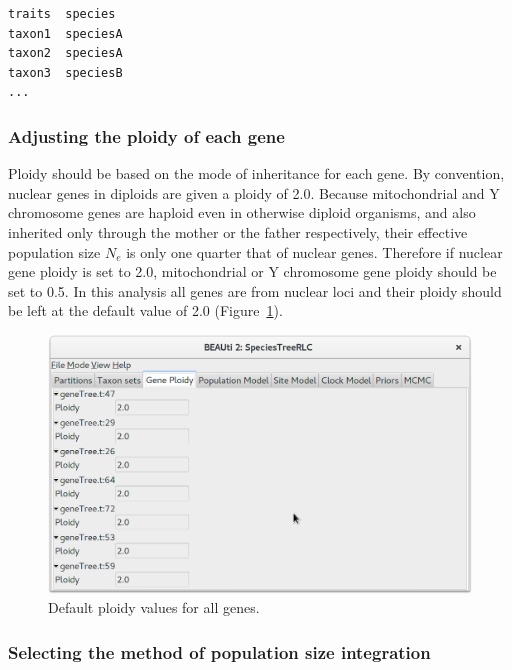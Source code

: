 \documentclass{article}
\begin{document}
\begin{minipage}[h]{0.7\textwidth}
\begin{verbatim}
traits	species
taxon1	speciesA
taxon2	speciesA
taxon3	speciesB
...
\end{verbatim}
\end{minipage}

\vspace{12pt}

\subsubsection*{Adjusting the ploidy of each gene}

Ploidy should be based on the mode of inheritance for each gene. By convention,
nuclear genes in diploids are given a ploidy of 2.0. Because mitochondrial and Y
chromosome genes are haploid even in otherwise diploid organisms, and also
inherited only through the mother or the father respectively, their effective
population size $N_e$ is only one quarter that of nuclear genes. Therefore if
nuclear gene ploidy is set to 2.0, mitochondrial or Y chromosome gene ploidy
should be set to 0.5. In this analysis all genes are from nuclear loci and their
ploidy should be left at the default value of 2.0 (Figure~\ref{fig:ploidy}).

\begin{figure}[htb!]
\centering
\includegraphics[width=\textwidth]{figures/beauti-ploidy.png}
\caption{Default ploidy values for all genes.}
\label{fig:ploidy}
\end{figure}

\subsubsection*{Selecting the method of population size integration}
\end{document}
